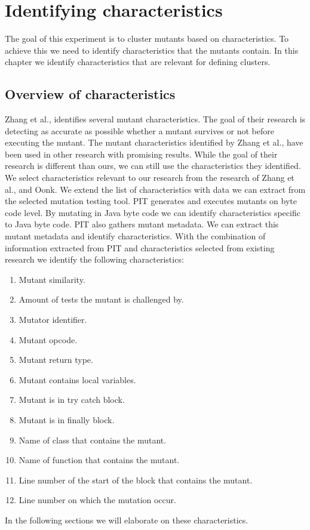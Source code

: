 \documentclass[../../main]{subfiles}
\begin{document}
\section{Identifying characteristics}
\label{ch:clustering_characteristics}
The goal of this experiment is to cluster mutants based on characteristics. 
To achieve this we need to identify characteristics that the mutants contain. 
In this chapter we identify characteristics that are relevant for defining clusters. 

\subsection{Overview of characteristics}
Zhang et al., identifies several mutant characteristics\cite{Zhang2019PredictiveTesting}. 
The goal of their research is detecting as accurate as possible whether a mutant survives or not before executing the mutant.
The mutant characteristics identified by Zhang et al., have been used in other research with promising results\cite{Oonk2021}.
While the goal of their research is different than ours, we can still use the characteristics they identified.
We select characteristics relevant to our research from the research of Zhang et al., and Oonk\cite{Oonk2021}.
We extend the list of characteristics with data we can extract from the selected mutation testing tool. 
\newline
PIT generates and executes mutants on byte code level\cite{pitestBytecode}.
By mutating in Java byte code we can identify characteristics specific to Java byte code.
PIT also gathers mutant metadata.
We can extract this mutant metadata and identify characteristics. 
With the combination of information extracted from PIT and characteristics selected from existing research we identify the following characteristics:
\begin{enumerate}
    \item Mutant similarity.
    \item Amount of tests the mutant is challenged by.
    \item Mutator identifier.
    \item Mutant opcode.
    \item Mutant return type.
    \item Mutant contains local variables.
    \item Mutant is in try catch block.
    \item Mutant is in finally block.
    \item Name of class that contains the mutant.
    \item Name of function that contains the mutant.
    \item Line number of the start of the block that contains the mutant.
    \item Line number on which the mutation occur.
\end{enumerate}
In the following sections we will elaborate on these characteristics.
\end{document}
